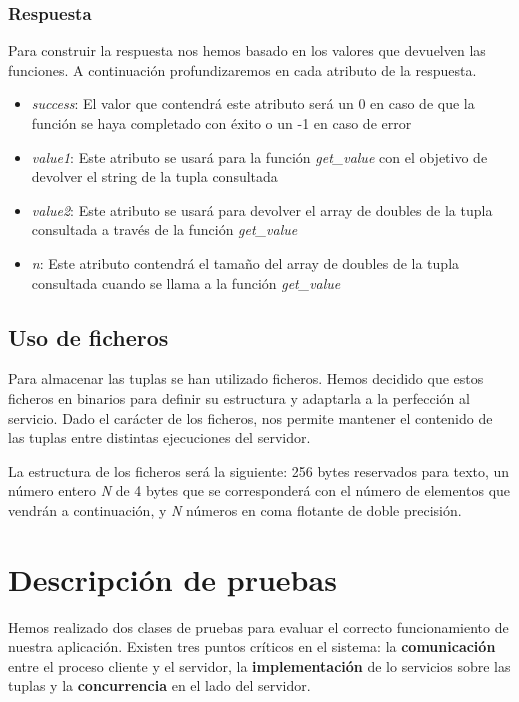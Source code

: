 \documentclass[]{article}
\begin{document}
\subsubsection{Respuesta}
\label{subsec::respuesta}
Para construir la respuesta nos hemos basado en los valores que devuelven las funciones. A continuación profundizaremos en cada atributo de la respuesta.

\begin{itemize}
  \item \textit{success}: El valor que contendrá este atributo será un 0 en caso de que la función se haya completado con éxito o un -1 en caso de error
  \item \textit{value1}: Este atributo se usará para la función \textit{get\_value} con el objetivo de devolver el string de la tupla consultada
  \item \textit{value2}: Este atributo se usará para devolver el array de doubles de la tupla consultada a través de la función \textit{get\_value}
  \item \textit{n}: Este atributo contendrá el tamaño del array de doubles de la tupla consultada cuando se llama a la función \textit{get\_value}
\end{itemize}

\subsection{Uso de ficheros}
\label{subsec:uso_de_ficheros}
Para almacenar las tuplas se han utilizado ficheros. Hemos decidido que estos ficheros en binarios para definir su estructura y adaptarla a la perfección al servicio.
Dado el carácter de los ficheros, nos permite mantener el contenido de las tuplas entre distintas ejecuciones del servidor. 

La estructura de los ficheros será la siguiente: 256 bytes reservados para texto, un número entero \textit{N} de 4 bytes que se corresponderá con el número de elementos que vendrán a continuación, y \textit{N} números en coma flotante de doble precisión. 


\section{Descripción de pruebas}
\label{sec:descripcion_de_pruebas}
Hemos realizado dos clases de pruebas para evaluar el correcto funcionamiento de nuestra aplicación. Existen tres puntos críticos en el sistema: la \textbf{comunicación} entre el proceso cliente y el servidor, la \textbf{implementación} de lo servicios sobre las tuplas y la \textbf{concurrencia} en el lado del servidor.  
\end{document}
